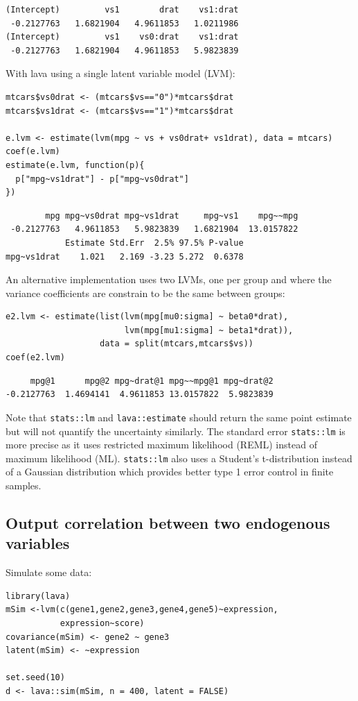\documentclass{article}
\begin{document}
\begin{verbatim}
(Intercept)         vs1        drat    vs1:drat 
 -0.2127763   1.6821904   4.9611853   1.0211986
(Intercept)         vs1    vs0:drat    vs1:drat 
 -0.2127763   1.6821904   4.9611853   5.9823839
\end{verbatim}


With lava using a single latent variable model (LVM):
\lstset{language=r,label= ,caption= ,captionpos=b,numbers=none}
\begin{lstlisting}
mtcars$vs0drat <- (mtcars$vs=="0")*mtcars$drat
mtcars$vs1drat <- (mtcars$vs=="1")*mtcars$drat

e.lvm <- estimate(lvm(mpg ~ vs + vs0drat+ vs1drat), data = mtcars)
coef(e.lvm)
estimate(e.lvm, function(p){
  p["mpg~vs1drat"] - p["mpg~vs0drat"]
})
\end{lstlisting}

\begin{verbatim}
        mpg mpg~vs0drat mpg~vs1drat     mpg~vs1    mpg~~mpg 
 -0.2127763   4.9611853   5.9823839   1.6821904  13.0157822
            Estimate Std.Err  2.5% 97.5% P-value
mpg~vs1drat    1.021   2.169 -3.23 5.272  0.6378
\end{verbatim}


An alternative implementation uses two LVMs, one per group and where
the variance coefficients are constrain to be the same between groups:
\lstset{language=r,label= ,caption= ,captionpos=b,numbers=none}
\begin{lstlisting}
e2.lvm <- estimate(list(lvm(mpg[mu0:sigma] ~ beta0*drat),
                        lvm(mpg[mu1:sigma] ~ beta1*drat)),
                   data = split(mtcars,mtcars$vs))
coef(e2.lvm)
\end{lstlisting}

\begin{verbatim}
     mpg@1      mpg@2 mpg~drat@1 mpg~~mpg@1 mpg~drat@2 
-0.2127763  1.4694141  4.9611853 13.0157822  5.9823839
\end{verbatim}


Note that \texttt{stats::lm} and \texttt{lava::estimate} should return the same
point estimate but will not quantify the uncertainty similarly. The
standard error \texttt{stats::lm} is more precise as it uses restricted
maximum likelihood (REML) instead of maximum likelihood
(ML). \texttt{stats::lm} also uses a Student's t-distribution instead of a
Gaussian distribution which provides better type 1 error control in
finite samples. 

\subsection{Output correlation between two endogenous variables}
\label{sec:org16c2fb1}
Simulate some data:
\lstset{language=r,label= ,caption= ,captionpos=b,numbers=none}
\begin{lstlisting}
library(lava)
mSim <-lvm(c(gene1,gene2,gene3,gene4,gene5)~expression,
           expression~score)
covariance(mSim) <- gene2 ~ gene3
latent(mSim) <- ~expression

set.seed(10)
d <- lava::sim(mSim, n = 400, latent = FALSE)
\end{lstlisting}
\end{document}
